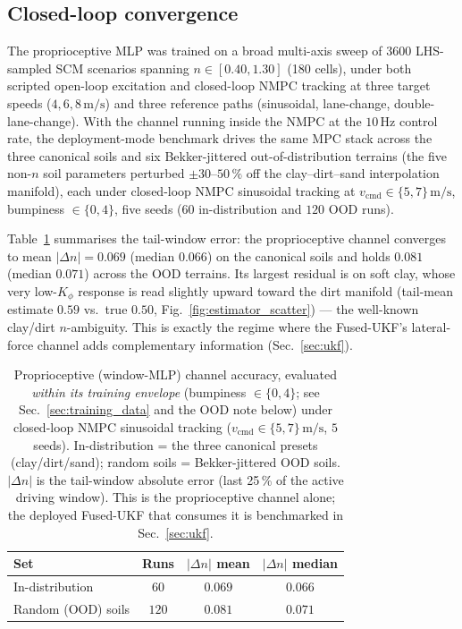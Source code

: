 \documentclass[conference,letterpaper,10pt]{IEEEtran}
\begin{document}
\subsection{Closed-loop convergence}
\label{sec:estimator_convergence}

The proprioceptive MLP was trained on a broad multi-axis sweep of 3600
LHS-sampled SCM scenarios spanning $n\in[0.40,1.30]$ (180 cells), under
both scripted open-loop excitation and closed-loop NMPC tracking at
three target speeds ($4,6,8\,\mathrm{m/s}$) and three reference paths
(sinusoidal, lane-change, double-lane-change). With the channel
running inside the NMPC at the $10\,\mathrm{Hz}$ control rate,
the deployment-mode benchmark drives the same MPC stack across the
three canonical soils and six Bekker-jittered out-of-distribution
terrains (the five non-$n$ soil parameters perturbed
$\pm 30\text{--}50\,\%$ off the clay--dirt--sand interpolation
manifold), each under closed-loop NMPC sinusoidal tracking at
$v_{\mathrm{cmd}}\!\in\!\{5,7\}\,\mathrm{m/s}$, bumpiness $\in\{0,4\}$,
five seeds ($60$ in-distribution and $120$ OOD runs).

Table~\ref{tab:estimator_pilot} summarises the tail-window error: the
proprioceptive channel converges to mean $|\Delta n|=0.069$ (median
$0.066$) on the canonical soils and holds $0.081$ (median $0.071$)
across the OOD terrains. Its largest residual is on soft clay, whose
very low-$K_\phi$ response is read slightly upward toward the dirt
manifold (tail-mean estimate $0.59$ vs.\ true $0.50$,
Fig.~\ref{fig:estimator_scatter}) --- the well-known clay/dirt
$n$-ambiguity. This is exactly the regime where the Fused-UKF's
lateral-force channel adds complementary information
(Sec.~\ref{sec:ukf}).

\begin{table}[!t]
  \renewcommand{\arraystretch}{1.10}
  \caption{Proprioceptive (window-MLP) channel accuracy, evaluated
    \emph{within its training envelope} (bumpiness $\in\{0,4\}$; see
    Sec.~\ref{sec:training_data} and the OOD note below) under
    closed-loop NMPC sinusoidal tracking
    ($v_{\mathrm{cmd}}\in\{5,7\}\,\mathrm{m/s}$, $5$ seeds).
    In-distribution = the three canonical presets (clay/dirt/sand);
    random soils = Bekker-jittered OOD soils. $|\Delta n|$ is the
    tail-window absolute error (last 25\,\% of the active driving
    window). This is the proprioceptive channel alone; the deployed
    Fused-UKF that consumes it is benchmarked in Sec.~\ref{sec:ukf}.}
  \label{tab:estimator_pilot}
  \centering
  \begin{tabular}{lccc}
    \toprule
    \textbf{Set} & \textbf{Runs} &
    \textbf{$|\Delta n|$ mean} & \textbf{$|\Delta n|$ median}\\
    \midrule
    In-distribution    & $60$  & $0.069$ & $0.066$\\
    Random (OOD) soils & $120$ & $0.081$ & $0.071$\\
    \bottomrule
  \end{tabular}
\end{table}
\end{document}
